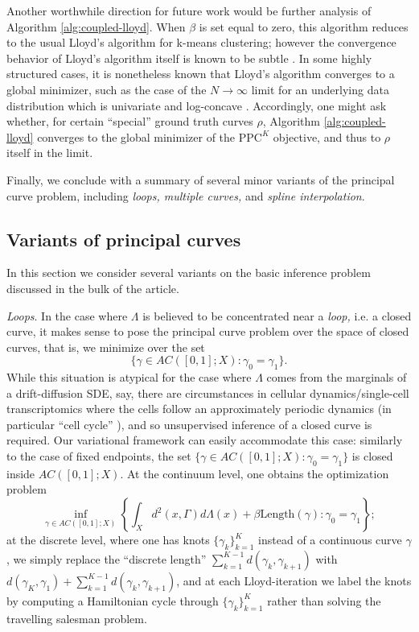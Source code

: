 \documentclass[aos, preprint]{imsart}
\theoremstyle{plain}
\theoremstyle{remark}
\begin{document}
Another worthwhile direction for future work would be further analysis
of Algorithm \ref{alg:coupled-lloyd}. When $\beta$ is set equal to
zero, this algorithm reduces to the usual Lloyd's algorithm for
k-means clustering; however the convergence behavior of Lloyd's
algorithm itself is known to be subtle \cite{du2006convergence}. In
some highly structured cases, it is nonetheless known that Lloyd's
algorithm converges to a global minimizer, such as the case of the
$N\rightarrow \infty$ limit for an underlying data distribution which
is univariate and log-concave \cite{trushkin1982sufficient}.
Accordingly, one might ask whether, for certain ``special'' ground truth curves $\rho$, Algorithm \ref{alg:coupled-lloyd} converges to the global minimizer of the $\textrm{PPC}^K$ objective, and thus to $\rho$ itself in the limit.

Finally, we conclude with a summary of several minor variants of the principal curve problem, including {\em loops, multiple curves,} and {\em spline interpolation}.

\subsection{Variants of principal curves}
In this section we consider several variants on the basic inference
problem discussed in the bulk of the article.


\emph{Loops}. In the case where $\Lambda$ is believed to be concentrated
near a \emph{loop, }i.e. a closed curve, it makes sense to pose the
principal curve problem over the space of closed curves, that is,
we minimize over the set
\[
\{\gamma\in AC([0,1];X):\gamma_{0}=\gamma_{1}\}.
\]
While this situation is atypical for the case where $\Lambda$ comes
from the marginals of a drift-diffusion SDE, say, there are circumstances in cellular
dynamics/single-cell transcriptomics where the cells follow an approximately
periodic dynamics (in particular ``cell cycle'' \cite{liu2017reconstructing}),
and so unsupervised inference of a closed curve is required. Our variational
framework can easily accommodate this case: similarly to the case of
fixed endpoints, the set $\{\gamma\in AC([0,1];X):\gamma_{0}=\gamma_{1}\}$
is closed inside $AC([0,1];X)$. At the continuum level, one obtains
the optimization problem
\[
\inf_{\gamma\in AC([0,1];X)}\left\{ \int_{X}d^{2}(x,\Gamma)d\Lambda(x)+\beta\text{Length}(\gamma):\gamma_{0}=\gamma_{1}\right\} ;
\]
at the discrete level, where one has knots $\{\gamma_{k}\}_{k=1}^{K}$
instead of a continuous curve $\gamma$, we simply replace the ``discrete
length'' $\sum_{k=1}^{K-1}d(\gamma_{k},\gamma_{k+1})$ with $d(\gamma_{K},\gamma_{1})+\sum_{k=1}^{K-1}d(\gamma_{k},\gamma_{k+1})$,
and at each Lloyd-iteration we label the knots by computing a Hamiltonian
cycle through $\{\gamma_{k}\}_{k=1}^{K}$ rather than solving the
travelling salesman problem.
\end{document}
